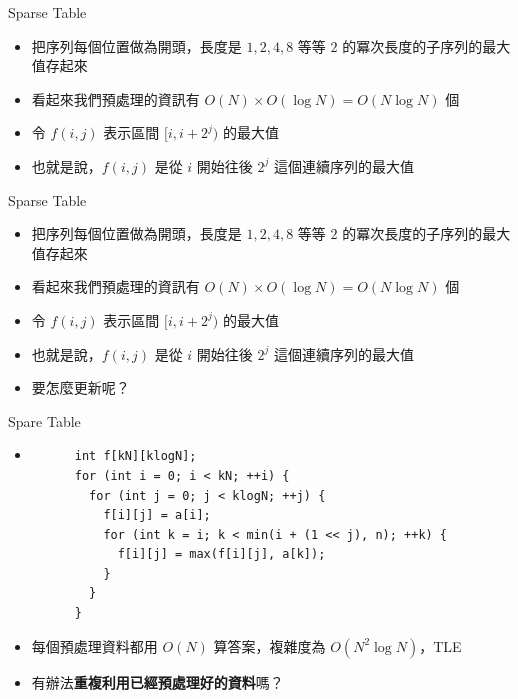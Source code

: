 \documentclass[standalone]{beamer}
\begin{document}
\begin{frame}{Sparse Table}
  \begin{itemize}
    \item 把序列每個位置做為開頭，長度是 $1, 2, 4, 8$ 等等 $2$ 的冪次長度的子序列的最大值存起來
    \item 看起來我們預處理的資訊有 $O(N) \times O(\log N) = O(N \log N)$ 個
    \item 令 \(f(i, j)\) 表示區間 \([i, i+2^j)\) 的最大值
    \item 也就是說，$f(i, j)$ 是從 $i$ 開始往後 $2^j$ 這個連續序列的最大值
  \end{itemize}
\end{frame}

\begin{frame}{Sparse Table}
  \begin{itemize}
    \item 把序列每個位置做為開頭，長度是 $1, 2, 4, 8$ 等等 $2$ 的冪次長度的子序列的最大值存起來
    \item 看起來我們預處理的資訊有 $O(N) \times O(\log N) = O(N \log N)$ 個
    \item 令 \(f(i, j)\) 表示區間 \([i, i+2^j)\) 的最大值
    \item 也就是說，$f(i, j)$ 是從 $i$ 開始往後 $2^j$ 這個連續序列的最大值
    \item 要怎麼更新呢？
  \end{itemize}
\end{frame}

\begin{frame}[fragile]{Spare Table}
  \begin{itemize}
    \item 
    \begin{verbatim}
      int f[kN][klogN];
      for (int i = 0; i < kN; ++i) {
        for (int j = 0; j < klogN; ++j) {
          f[i][j] = a[i];
          for (int k = i; k < min(i + (1 << j), n); ++k) {
            f[i][j] = max(f[i][j], a[k]);
          }
        }
      }
    \end{verbatim}
    \item 每個預處理資料都用 $O(N)$ 算答案，複雜度為 $O(N^2 \log N)$，TLE
    \item 有辦法\textbf{重複利用已經預處理好的資料}嗎？
  \end{itemize}
\end{frame}
\end{document}
